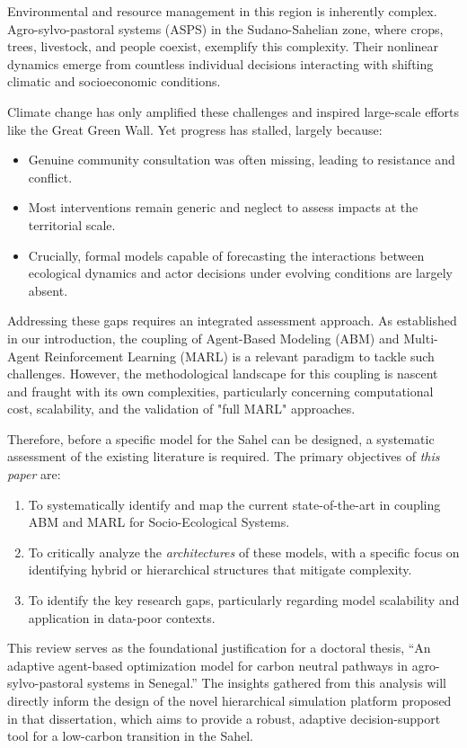 \documentclass[conference]{IEEEtran}
\begin{document}
Environmental and resource management in this region is inherently complex. Agro-sylvo-pastoral systems (ASPS) in the Sudano-Sahelian zone, where crops, trees, livestock, and people coexist, exemplify this complexity. Their nonlinear dynamics emerge from countless individual decisions interacting with shifting climatic and socioeconomic conditions.

Climate change has only amplified these challenges and inspired large-scale efforts like the Great Green Wall. Yet progress has stalled, largely because:
\begin{itemize}
    \item Genuine community consultation was often missing, leading to resistance and conflict.
    \item Most interventions remain generic and neglect to assess impacts at the territorial scale.
    \item Crucially, formal models capable of forecasting the interactions between ecological dynamics and actor decisions under evolving conditions are largely absent.
\end{itemize}

Addressing these gaps requires an integrated assessment approach. As established in our introduction, the coupling of Agent-Based Modeling (ABM) and Multi-Agent Reinforcement Learning (MARL) is a relevant paradigm to tackle such challenges. However, the methodological landscape for this coupling is nascent and fraught with its own complexities, particularly concerning computational cost, scalability, and the validation of "full MARL" approaches.

Therefore, before a specific model for the Sahel can be designed, a systematic assessment of the existing literature is required. The primary objectives of \textit{this paper} are:
\begin{enumerate}
    \item To systematically identify and map the current state-of-the-art in coupling ABM and MARL for Socio-Ecological Systems.
    \item To critically analyze the \textit{architectures} of these models, with a specific focus on identifying hybrid or hierarchical structures that mitigate complexity.
    \item To identify the key research gaps, particularly regarding model scalability and application in data-poor contexts.
\end{enumerate}

This review serves as the foundational justification for a doctoral thesis, ``An adaptive agent-based optimization model for carbon neutral pathways in agro-sylvo-pastoral systems in Senegal.'' The insights gathered from this analysis will directly inform the design of the novel hierarchical simulation platform proposed in that dissertation, which aims to provide a robust, adaptive decision-support tool for a low-carbon transition in the Sahel.
\end{document}
